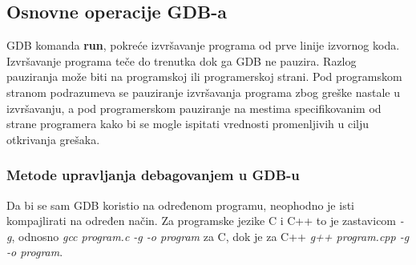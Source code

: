 \documentclass[a4paper]{article}
\begin{document}
\subsection{Osnovne operacije GDB-a}
\label{subsec:debager_operacije}

GDB komanda \textbf{run}, pokreće izvršavanje programa od prve linije izvornog koda.
Izvršavanje programa teče do trenutka dok ga GDB ne pauzira. 
Razlog pauziranja može biti na programskoj ili programerskoj strani.
Pod programskom stranom podrazumeva se pauziranje
izvršavanja programa zbog greške nastale u izvršavanju, a pod programerskom
pauziranje na mestima specifikovanim od strane programera kako bi se mogle ispitati
vrednosti promenljivih u cilju otkrivanja grešaka.

\subsubsection{Metode upravljanja debagovanjem u GDB-u}
\label{subsec:gdb_metode}

Da bi se sam GDB koristio na određenom programu, neophodno je isti kompajlirati 
na određen način. Za programske jezike C i C++ to je zastavicom \textit{-g}, odnosno
\textit{gcc program.c -g -o program} za C, dok je za C++ \textit{g++ program.cpp -g -o program}.
\end{document}
